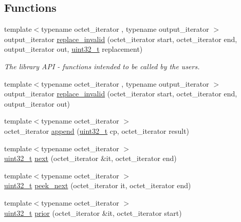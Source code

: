 \subsection*{Functions}
\begin{DoxyCompactItemize}
\item 
{\footnotesize template$<$typename octet\+\_\+iterator , typename output\+\_\+iterator $>$ }\\output\+\_\+iterator \hyperlink{namespaceutf8_a07dcd36a2185e5c9f0b19dd88859cd6c}{replace\+\_\+invalid} (octet\+\_\+iterator start, octet\+\_\+iterator end, output\+\_\+iterator out, \hyperlink{namespaceutf8_a846259d2f173d524282583fc9d825b00}{uint32\+\_\+t} replacement)
\begin{DoxyCompactList}\small\item\em The library A\+PI -\/ functions intended to be called by the users. \end{DoxyCompactList}\item 
{\footnotesize template$<$typename octet\+\_\+iterator , typename output\+\_\+iterator $>$ }\\output\+\_\+iterator \hyperlink{namespaceutf8_a13db09b6629724205302c623b76db028}{replace\+\_\+invalid} (octet\+\_\+iterator start, octet\+\_\+iterator end, output\+\_\+iterator out)
\item 
{\footnotesize template$<$typename octet\+\_\+iterator $>$ }\\octet\+\_\+iterator \hyperlink{namespaceutf8_a3827e78596fc38cfdebd721e9c45c901}{append} (\hyperlink{namespaceutf8_a846259d2f173d524282583fc9d825b00}{uint32\+\_\+t} cp, octet\+\_\+iterator result)
\item 
{\footnotesize template$<$typename octet\+\_\+iterator $>$ }\\\hyperlink{namespaceutf8_a846259d2f173d524282583fc9d825b00}{uint32\+\_\+t} \hyperlink{namespaceutf8_afc093dfde66a6f52cb4a5caefe0e580d}{next} (octet\+\_\+iterator \&it, octet\+\_\+iterator end)
\item 
{\footnotesize template$<$typename octet\+\_\+iterator $>$ }\\\hyperlink{namespaceutf8_a846259d2f173d524282583fc9d825b00}{uint32\+\_\+t} \hyperlink{namespaceutf8_a42451db4241d57afe46e61f6a966ee8d}{peek\+\_\+next} (octet\+\_\+iterator it, octet\+\_\+iterator end)
\item 
{\footnotesize template$<$typename octet\+\_\+iterator $>$ }\\\hyperlink{namespaceutf8_a846259d2f173d524282583fc9d825b00}{uint32\+\_\+t} \hyperlink{namespaceutf8_a9a599fdd8a16ce65e3e72192db9d499b}{prior} (octet\+\_\+iterator \&it, octet\+\_\+iterator start)

\end{DoxyCompactItemize}
